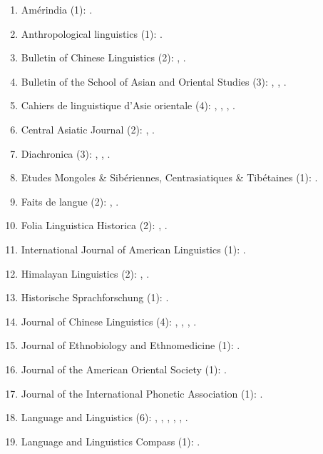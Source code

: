 \documentclass[oneside,a4paper,11pt]{article}
\begin{document}
 \begin{enumerate}
 \item Amérindia (1): \cite{jacques12bear}.
 \item Anthropological linguistics (1): \cite{japhug14ideophones}.
 \item Bulletin of Chinese Linguistics (2): \cite{jacques15derivational.khaling}, \cite{jacques16ssuffixes}.
 \item Bulletin of the School of Asian and Oriental Studies (3):  \cite{jacques10refl}, \cite{rg-gj12yod}, \cite{jacques13yod}.
 \item Cahiers de linguistique d'Asie orientale (4): \cite{jacques00ywij},  \cite{jacques03dissimilation},   \cite{jacques07chang},  \cite{michaud10bonin}.
 \item Central Asiatic Journal (2):  \cite{jacques10imperial}, \cite{jacques14ergative}.
  \item Diachronica (3): \cite{jacques.michaud11naish}, \cite{michaud-jacques12nasalite}, \cite{jacques16comparative}.
  \item Etudes Mongoles \& Sibériennes, Centrasiatiques \& Tibétaines (1):  \cite{jacques09e}.
  \item Faits de langue (2): \cite{jacques07redupl}, \cite{jacques16polysynthetique}.
 \item Folia Linguistica Historica (2): \cite{jacques13arapaho}, \cite{jacques15causative}.
 \item International Journal of American Linguistics (1): \cite{jacques16ebde}.
 \item Himalayan Linguistics (2): \cite{jacques10zos},  \cite{jacques14rtau}.
 \item Historische Sprachforschung (1): \cite{jacques15cochon}.
 \item Journal of Chinese Linguistics (4):   \cite{jacques11tangut.verb}, \cite{jacques15sr}, \cite{jacques16relatives}, \cite{jacques17buyang}.
 \item Journal of Ethnobiology and Ethnomedicine (1): \cite{Kang2016}.
 \item Journal of the American Oriental Society (1): \cite{jacques11ngwemi}.
 \item Journal of the International Phonetic Association (1): \cite{jacques18ipa}.
   \item Language and Linguistics (6):  \cite{jacques07passif}, \cite{jacques09tangutverb}, \cite{jacques10inverse},     \cite{jacques11pumi.tone}, \cite{jacques12agreement},    \cite{jacques12khaling}.  
   \item  Language and Linguistics Compass (1): \cite{jacques14inverse}.   

\end{enumerate}
\end{document}
